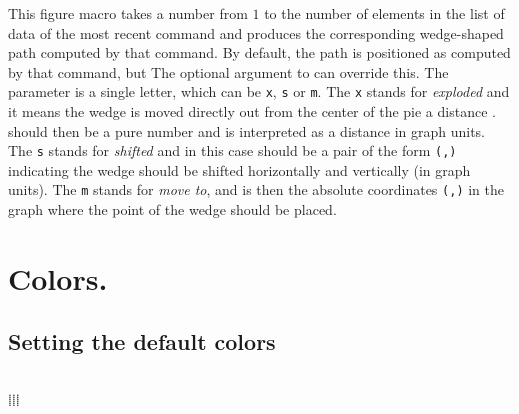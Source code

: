 \documentclass[letterpaper]{article}
\begin{document}
This figure macro takes a number from $1$ to the number of elements in
the list of data of the most recent  command and produces
the corresponding wedge-shaped path computed by that command. By
default, the path is positioned as computed by that 
command, but The optional argument to  can override this.
The parameter  is a single letter, which can be \texttt{x},
\texttt{s} or \texttt{m}. The \texttt{x} stands for \emph{exploded} and
it means the wedge is moved directly out from the center of the pie a
distance .  should then be a pure number and is
interpreted as a distance in graph units. The \texttt{s} stands for
\emph{shifted} and in this case  should be a pair of the
form \texttt{(,)} indicating the wedge should be
shifted  horizontally and  vertically (in graph
units). The \texttt{m} stands for \emph{move to}, and  is
then the absolute coordinates \texttt{(,)} in the graph
where the point of the wedge should be placed.

\section{Colors.}\label{colors}

\subsection{Setting the default colors}\label{defaultcolors}

\begin{cd}
\\
$\ldots$\\
$\ldots$\\
$\ldots$\\
$\ldots$\\
$\ldots$\\
$\ldots$%
%
%
%
%
%
%
%
\end{cd}
\end{document}
